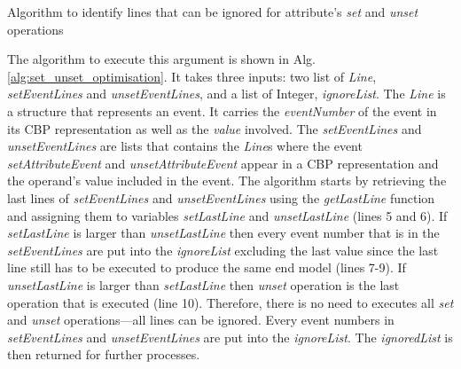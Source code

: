 \documentclass{llncs}
\begin{document}
\begin{algorithm}
\begin{small}
\end{small}
\caption{Algorithm to identify lines that can be ignored for attribute's \emph{set} and \emph{unset} operations}
\label{alg:set_unset_optimisation}
\end{algorithm}

The algorithm to execute this argument is shown in Alg. \ref{alg:set_unset_optimisation}. It takes three inputs: two list of \emph{Line}, \emph{setEventLines} and \emph{unsetEventLines}, and a list of Integer, \emph{ignoreList}. The \emph{Line} is a structure that represents an event. It carries the \emph{eventNumber} of the event in its CBP representation as well as the \emph{value} involved. The \emph{setEventLines} and \emph{unsetEventLines} are lists that contains the \emph{Line}s where the event \emph{setAttributeEvent} and \emph{unsetAttributeEvent} appear in a CBP representation and the operand's value included in the event. The algorithm starts by retrieving the last lines of \emph{setEventLines} and \emph{unsetEventLines} using the \emph{getLastLine} function and assigning them to variables \emph{setLastLine} and \emph{unsetLastLine} (lines 5 and 6). If \emph{setLastLine} is larger than \emph{unsetLastLine} then every event number that is in the \emph{setEventLines} are put into the \emph{ignoreList} excluding the last value since the last line still has to be executed to produce the same end model (lines 7-9). If \emph{unsetLastLine} is larger than \emph{setLastLine} then \emph{unset} operation is the last operation that is executed (line 10). Therefore, there is no need to executes all \emph{set} and \emph{unset} operations---all lines can be ignored. Every event numbers in \emph{setEventLines} and \emph{unsetEventLines} are put into the \emph{ignoreList}. The \emph{ignoredList} is then returned for further processes.
\end{document}
